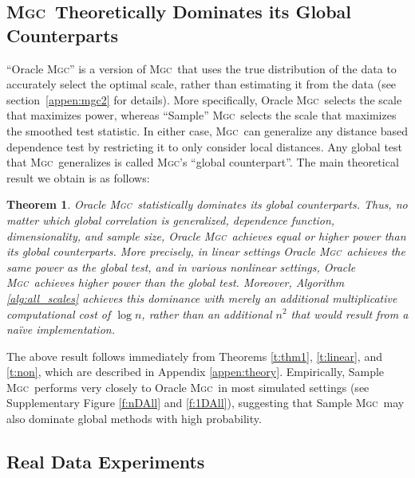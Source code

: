\documentclass[11pt]{article}
\providecommand{\sct}[1]{{\normalfont\textsc{#1}}}
\newcommand{\Mgc}{\sct{Mgc}}
\newtheorem{thm}{Theorem}
\begin{document}
\subsection*{\Mgc~Theoretically Dominates its Global Counterparts}
\label{s:theory}

``Oracle \Mgc'' is a version of \Mgc~that uses the true distribution of the data to accurately select the optimal scale, rather than estimating it from the data (see section~\ref{appen:mgc2} for details). More specifically, Oracle \Mgc~selects the scale that maximizes power, whereas ``Sample'' \Mgc~selects the scale that maximizes the smoothed test statistic. 
In either case,  \Mgc~can generalize any distance based dependence test by restricting it to only consider local distances.  Any global test that \Mgc~generalizes is called \Mgc's ``global counterpart''.  The main theoretical result we obtain is as follows:
% 
\begin{thm} \label{t:dominate}
Oracle \Mgc~statistically dominates its global counterparts. Thus, no matter which global correlation is generalized, dependence function, dimensionality, and sample size, Oracle \Mgc~achieves equal or higher power than its global counterparts.  More precisely, in \emph{linear} settings Oracle \Mgc~achieves the same power as the global test, and in various nonlinear settings, Oracle \Mgc~achieves {higher} power than the global test. Moreover, Algorithm \ref{alg:all_scales} achieves this dominance with merely an additional multiplicative computational cost of $\log n$, rather than an additional $n^2$ that would result from a na\"ive implementation.
\end{thm}

The above result follows immediately from Theorems \ref{t:thm1}, \ref{t:linear}, and \ref{t:non}, which are described in Appendix \ref{appen:theory}.   Empirically, Sample \Mgc~performs very closely to Oracle \Mgc~in most simulated settings (see Supplementary Figure \ref{f:nDAll} and \ref{f:1DAll}), suggesting that Sample \Mgc~may also dominate global methods with high probability.

\subsection*{Real Data Experiments}
\label{numer3}
\end{document}
